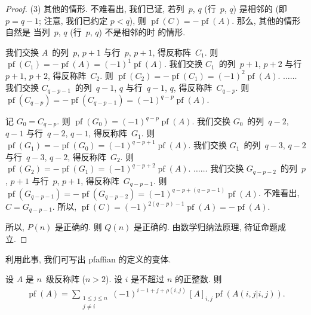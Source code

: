 \begin{proof}
    (3)
    其他的情形.
    不难看出, 我们已证,
    若列~\(p\), \(q\) (行~\(p\), \(q\)) 是相邻的
    (即 \(p = q - 1\);
    注意, 我们已约定 \(p < q\)),
    则 \(\operatorname{pf} {(C)}
    = -\operatorname{pf} {(A)}\).
    那么, 其他的情形自然是%
    当列~\(p\), \(q\) (行~\(p\), \(q\)) 不是相邻的时%
    的情形.

    我们交换 \(A\)~的列~\(p\), \(p+1\) 与行~\(p\), \(p+1\),
    得反称阵~\(C_1\).
    则 \(\operatorname{pf} {(C_1)} = -\operatorname{pf} {(A)}
    = (-1)^{1} \operatorname{pf} {(A)}\).
    我们交换 \(C_1\)~的列~\(p+1\), \(p+2\) 与行~\(p+1\), \(p+2\),
    得反称阵~\(C_2\).
    则 \(\operatorname{pf} {(C_2)} = -\operatorname{pf} {(C_1)}
    = (-1)^{2} \operatorname{pf} {(A)}\).
    \(\dots \dots\)
    我们交换 \(C_{q-p-1}\)~的列~\(q-1\), \(q\) 与行~\(q-1\), \(q\),
    得反称阵~\(C_{q-p}\).
    则 \(\operatorname{pf} {(C_{q-p})} = -\operatorname{pf} {(C_{q-p-1})}
    = (-1)^{q-p} \operatorname{pf} {(A)}\).

    记 \(G_0 = C_{q-p}\).
    则 \(\operatorname{pf} {(G_0)} = (-1)^{q-p} \operatorname{pf} {(A)}\).
    我们交换 \(G_0\)~的列~\(q-2\), \(q-1\) 与行~\(q-2\), \(q-1\),
    得反称阵~\(G_1\).
    则 \(\operatorname{pf} {(G_1)} = -\operatorname{pf} {(G_0)}
    = (-1)^{q-p+1} \operatorname{pf} {(A)}\).
    我们交换 \(G_1\)~的列~\(q-3\), \(q-2\) 与行~\(q-3\), \(q-2\),
    得反称阵~\(G_2\).
    则 \(\operatorname{pf} {(G_2)} = -\operatorname{pf} {(G_1)}
    = (-1)^{q-p+2} \operatorname{pf} {(A)}\).
    \(\dots \dots\)
    我们交换 \(G_{q-p-2}\)~的列~\(p\), \(p+1\) 与行~\(p\), \(p+1\),
    得反称阵~\(G_{q-p-1}\).
    则 \(\operatorname{pf} {(G_{q-p-1})} = -\operatorname{pf} {(G_{q-p-2})}
    = (-1)^{q-p+(q-p-1)} \operatorname{pf} {(A)}\).
    不难看出, \(C = G_{q-p-1}\).
    所以,
    \(\operatorname{pf} {(C)}
    = (-1)^{2(q-p)-1} \operatorname{pf} {(A)}
    = -\operatorname{pf} {(A)}\).

    所以, \(P(n)\) 是正确的.
    则 \(Q(n)\) 是正确的.
    由数学归纳法原理, 待证命题成立.
\end{proof}

利用此事, 我们可写出 pfaffian 的定义的变体.

\begin{theorem}
    设 \(A\) 是 \(n\)~级反称阵 (\(n > 2\)).
    设 \(i\) 是不超过 \(n\) 的正整数.
    则
    \begin{align*}
        \operatorname{pf} {(A)}
        =
        \sum_{\substack{1 \leq j \leq n \\j \neq i}}
        {
        (-1)^{i-1+j+\rho(i,j)}\, [A]_{i,j}
        \operatorname{pf} {(A({i,j}|{i,j}))}}.
    \end{align*}
\end{theorem}

